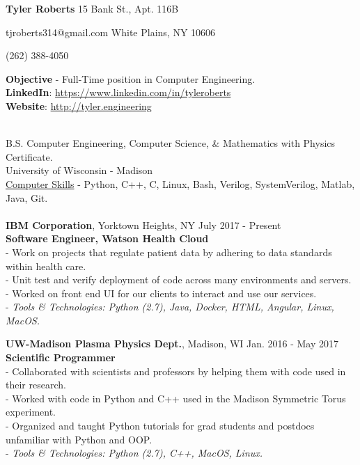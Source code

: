 \documentclass{resume}
\begin{document}
\begin{adjustwidth}{75mm}{}
{\LARGE \bf Tyler Roberts} \hfill 15 Bank St., Apt. 116B
\end{adjustwidth}
\begin{adjustwidth}{80mm}{}
{\normalsize tjroberts314@gmail.com} \hfill White Plains, NY 10606
\end{adjustwidth}
\begin{adjustwidth}{87.5mm}{}
{\normalsize (262) 388-4050}
\end{adjustwidth}
\begin{flushleft}
	\textbf{Objective} - Full-Time position in Computer Engineering. \\
	\textbf{LinkedIn}:
	\href{https://www.linkedin.com/in/tyleroberts}{https://www.linkedin.com/in/tyleroberts} \\
	\textbf{Website}:
	\href{http://tyler.engineering}{http://tyler.engineering} \vspace{\baselineskip}

 \\
{\bigsize
B.S. Computer Engineering, Computer Science, \& Mathematics with Physics Certificate. \\
University of Wisconsin - Madison \\
\underline{Computer Skills} - Python, C++, C, Linux, Bash, Verilog, SystemVerilog, Matlab, Java, Git.} \\[5mm]
\\[2mm]

\textbf{IBM Corporation}, Yorktown Heights, NY \hfill July 2017 - Present\\
\textbf{Software Engineer, Watson Health Cloud}\\
{\footnotesize
	\ttab- Work on projects that regulate patient data by adhering to data standards within health care.\\
	\ttab- Unit test and verify deployment of code across many environments and servers. \\
	\ttab- Worked on front end UI for our clients to interact and use our services. \\
	\ttab- \textit{Tools \& Technologies: Python (2.7), Java, Docker, HTML, Angular, Linux, MacOS.}\\[3mm]
}

\textbf{UW-Madison Plasma Physics Dept.}, Madison, WI \hfill Jan. 2016 - May 2017 \\
\textbf{Scientific Programmer}\\
{\footnotesize
	\ttab- Collaborated with scientists and professors by helping them with code used in their research. \\
	\ttab- Worked with code in Python and C++ used in the Madison Symmetric Torus experiment. \\
	\ttab- Organized and taught Python tutorials for grad students and postdocs unfamiliar with Python and OOP. \\
	\ttab- \textit{Tools \& Technologies: Python (2.7), C++,  MacOS, Linux.}\\[5mm]
}


\end{flushleft}
\end{document}
